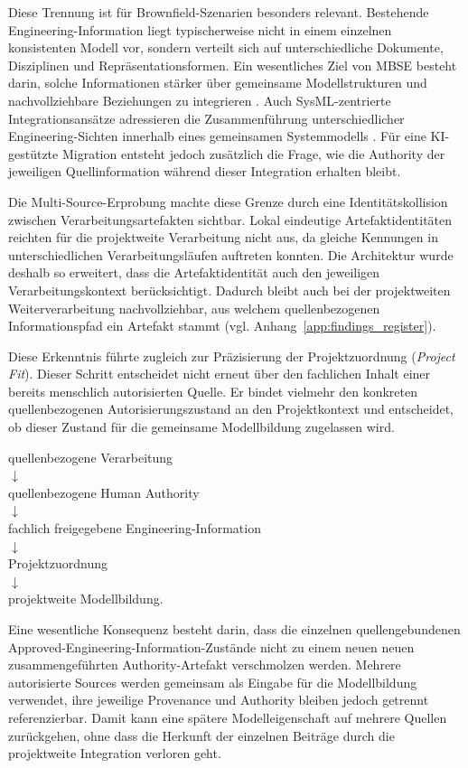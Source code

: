 Diese Trennung ist für Brownfield-Szenarien besonders relevant. Bestehende
Engineering-Information liegt typischerweise nicht in einem einzelnen
konsistenten Modell vor, sondern verteilt sich auf unterschiedliche
Dokumente, Disziplinen und Repräsentationsformen. Ein wesentliches Ziel von
MBSE besteht darin, solche Informationen stärker über gemeinsame
Modellstrukturen und nachvollziehbare Beziehungen zu integrieren
\cite{Hendriks2022}. Auch SysML-zentrierte Integrationsansätze adressieren
die Zusammenführung unterschiedlicher Engineering-Sichten innerhalb eines
gemeinsamen Systemmodells \cite{Zhao.2023}. Für eine KI-gestützte Migration
entsteht jedoch zusätzlich die Frage, wie die Authority der jeweiligen
Quellinformation während dieser Integration erhalten bleibt.

Die Multi-Source-Erprobung machte diese Grenze durch eine
Identitätskollision zwischen Verarbeitungsartefakten sichtbar. Lokal
eindeutige Artefaktidentitäten reichten für die projektweite Verarbeitung
nicht aus, da gleiche Kennungen in unterschiedlichen Verarbeitungsläufen
auftreten konnten. Die Architektur wurde deshalb so erweitert, dass die
Artefaktidentität auch den jeweiligen Verarbeitungskontext berücksichtigt.
Dadurch bleibt auch bei der projektweiten Weiterverarbeitung nachvollziehbar,
aus welchem quellenbezogenen Informationspfad ein Artefakt stammt
(vgl. Anhang~\ref{app:findings_register}).

Diese Erkenntnis führte zugleich zur Präzisierung der Projektzuordnung
(\emph{Project Fit}). Dieser Schritt entscheidet nicht erneut über den
fachlichen Inhalt einer bereits menschlich autorisierten Quelle. Er bindet
vielmehr den konkreten quellenbezogenen Autorisierungszustand an den
Projektkontext und entscheidet, ob dieser Zustand für die gemeinsame
Modellbildung zugelassen wird.

\begin{center}
quellenbezogene Verarbeitung\\
$\downarrow$\\
quellenbezogene Human Authority\\
$\downarrow$\\
fachlich freigegebene Engineering-Information\\
$\downarrow$\\
Projektzuordnung\\
$\downarrow$\\
projektweite Modellbildung.
\end{center}

Eine wesentliche Konsequenz besteht darin, dass die einzelnen
quellengebundenen Approved-Engineering-Information-Zustände nicht zu einem neuen
neuen zusammengeführten Authority-Artefakt verschmolzen werden. Mehrere autorisierte
Sources werden gemeinsam als Eingabe für die Modellbildung verwendet, ihre
jeweilige Provenance und Authority bleiben jedoch getrennt referenzierbar.
Damit kann eine spätere Modelleigenschaft auf mehrere Quellen zurückgehen,
ohne dass die Herkunft der einzelnen Beiträge durch die projektweite
Integration verloren geht.

